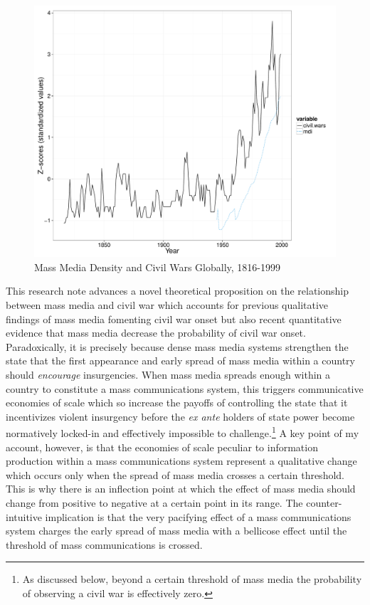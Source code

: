 \documentclass[11pt,article,oneside]{memoir}
\makeatletter
\def\maxwidth{\ifdim\Gin@nat@width>\linewidth\linewidth
\else\Gin@nat@width\fi}
\let\Oldincludegraphics\includegraphics
\renewcommand{\includegraphics}[1]{\Oldincludegraphics[width=\maxwidth]{#1}}
\makeatother
\begin{document}
\begin{figure}[htbp]
\centering
\includegraphics{media_civil_war_files/figure-markdown/globalplot.pdf}
\caption{Mass Media Density and Civil Wars Globally, 1816-1999}
\end{figure}

This research note advances a novel theoretical proposition on the
relationship between mass media and civil war which accounts for
previous qualitative findings of mass media fomenting civil war onset
but also recent quantitative evidence that mass media decrease the
probability of civil war onset. Paradoxically, it is precisely because
dense mass media systems strengthen the state that the first appearance
and early spread of mass media within a country should \emph{encourage}
insurgencies. When mass media spreads enough within a country to
constitute a mass communications system, this triggers communicative
economies of scale which so increase the payoffs of controlling the
state that it incentivizes violent insurgency before the \emph{ex ante}
holders of state power become normatively locked-in and effectively
impossible to challenge.\footnote{As discussed below, beyond a certain
  threshold of mass media the probability of observing a civil war is
  effectively zero.} A key point of my account, however, is that the
economies of scale peculiar to information production within a mass
communications system represent a qualitative change which occurs only
when the spread of mass media crosses a certain threshold. This is why
there is an inflection point at which the effect of mass media should
change from positive to negative at a certain point in its range. The
counter-intuitive implication is that the very pacifying effect of a
mass communications system charges the early spread of mass media with a
bellicose effect until the threshold of mass communications is crossed.
\end{document}
